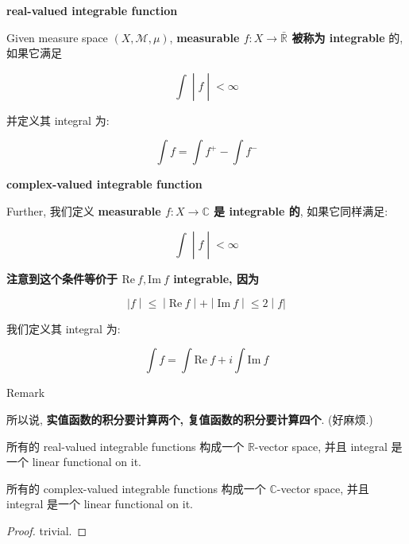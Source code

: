 \documentclass{qlnotes-export}
\begin{document}
\begin{definition}{\protect{}\label{kn-real-valued-integrable-function}{\textbf{real-valued
integrable function}}}

Given measure space \((X,\mathcal{M},\mu)\), \textbf{measurable \(f:X\rightarrow\bar{\mathbb{R}}\) 被称为 integrable} 的, 如果它满足

\[\left. \int \middle| f \middle| < \infty \right.\]

并定义其 integral 为:

\[\int f = \int f^{+} - \int f^{-}\]

\end{definition}

\begin{definition}{\protect{}\label{kn-complex-valued-integrable-function}{\textbf{complex-valued
integrable function}}}

Further, 我们定义 \textbf{measurable \(f:X\rightarrow{\mathbb{C}}\) 是 integrable 的}, 如果它同样满足:

\[\left. \int \middle| f \middle| < \infty \right.\]

\textbf{注意到这个条件等价于 \(\text{Re}\ f,\text{Im}\ f\) integrable, 因为}

\[\left. |f \middle| \leq \middle| \text{Re}\ f \middle| + \middle| \text{Im}\ f \middle| \leq 2 \middle| f| \right.\]

我们定义其 integral 为:

\[\int f = \int\text{Re}\ f + i\int\text{Im}\ f\]

\end{definition}

\begin{qlremark}{Remark}

所以说, \textbf{实值函数的积分要计算两个, 复值函数的积分要计算四个}. (好麻烦.)

\end{qlremark}

\begin{proposition}

所有的 real-valued integrable functions 构成一个 \(\mathbb{R}\)-vector space, 并且 integral 是一个 linear functional on it.

所有的 complex-valued integrable functions 构成一个 \(\mathbb{C}\)-vector space, 并且 integral 是一个 linear functional on it.

\end{proposition}

\begin{proof}

trivial.

\end{proof}
\end{document}
